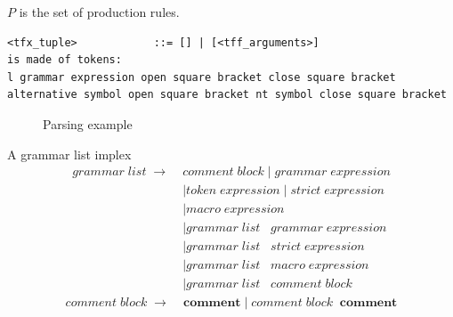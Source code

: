 $P$ is the set of production rules. 
\begin{lstlisting}[basicstyle=\scriptsize	,caption= Production element,label= lst:Parser_example_productionelement]
<tfx_tuple>            ::= [] | [<tff_arguments>]
is made of tokens:
l grammar expression open square bracket close square bracket alternative symbol open square bracket nt symbol close square bracket
\end{lstlisting}
\begin{figure}[h]
\caption{Parsing example}
\label{fig:ImplementationParsing}
\end{figure}


A grammar list implex
\begin{align*}
	grammar\;list\; \rightarrow\; &comment\;block
	     		\mid grammar\;expression  \\
			   &\mid token\;expression
                \mid strict\;expression\\
               &\mid macro\;expression \\
               &\mid grammar\;list\;\;\;grammar\;expression\\
               &\mid grammar\;list\;\;\;strict\;expression \\
               &\mid grammar\;list\;\;\;macro\;expression \\
               &\mid grammar\;list\;\;\;comment\;block               
\end{align*}
\begin{align*}
    comment\;block\; \rightarrow\; &\textbf{comment}
                \mid comment\;block\;\;\textbf{comment}
\end{align*}

